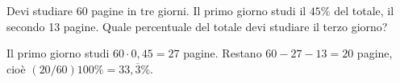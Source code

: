 
\begin{esercizio}
Devi studiare 60 pagine in tre giorni. Il primo giorno studi il $45\%$ del totale, il secondo 13 pagine. Quale percentuale del totale devi studiare il terzo giorno?
\end{esercizio}

\begin{soluzione}
Il primo giorno studi $60\cdot0{,}45=27$ pagine. Restano $60-27-13=20$ pagine, cioè $(20/60)100\%=33{,}\overline3\%$.
\end{soluzione}

